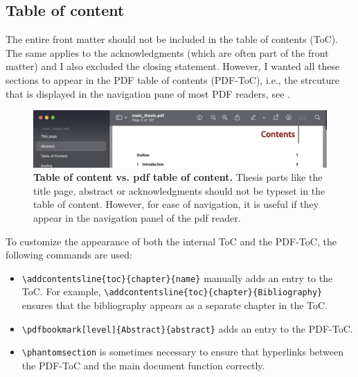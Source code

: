 \subsection{Table of content}
The entire front matter should not be included in the table of contents (ToC). The same applies to the acknowledgments (which are often part of the front matter) and I also excluded the closing statement. However, I wanted all these sections to appear in the PDF table of contents (PDF-ToC), i.e., the strcuture that is displayed in the navigation pane of most PDF readers, see .

\begin{figure}
	\includegraphics[width = \textwidth]{pdf-toc.png}
	\caption{\textbf{Table of content vs. pdf table of content.} Thesis parts like the title page, abstract or acknowledgments should not be typeset in the table of content. However, for ease of navigation, it is useful if they appear in the navigation panel of the pdf reader.}
	\label{fig:pdf-toc}
\end{figure}

To customize the appearance of both the internal ToC and the PDF-ToC, the following commands are used:
\begin{itemize}
	\item \verb|\addcontentsline{toc}{chapter}{name}|  manually adds an entry to the ToC.  For example, \verb|\addcontentsline{toc}{chapter}{Bibliography}| ensures that the bibliography appears as a separate chapter in the ToC.
	\item \verb|\pdfbookmark[level]{Abstract}{abstract}| adds an entry to the PDF-ToC.
	\item \verb|\phantomsection| is sometimes necessary to ensure that hyperlinks between the PDF-ToC and the main document function correctly.
\end{itemize}


